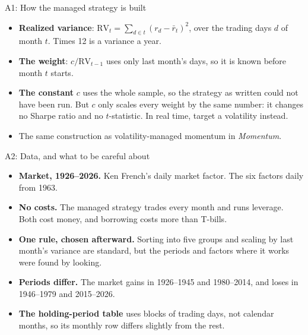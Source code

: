 \documentclass[aspectratio=169,10pt]{beamer}
\begin{document}
\begin{frame}[label=appendix_rv]{A1: How the managed strategy is built}
\begin{itemize}
\item \textbf{Realized variance}: $\text{RV}_{t} = \sum_{d \in t} (r_{d} - \bar r_{t})^{2}$, over the trading days $d$ of month $t$. Times 12 is a variance a year.
\vskip 8pt
\item \textbf{The weight}: $c/\text{RV}_{t-1}$ uses only last month's days, so it is known before month $t$ starts.
\vskip 8pt
\item \textbf{The constant} $c$ uses the whole sample, so the strategy as written could not have been run. But $c$ only scales every weight by the same number: it changes no Sharpe ratio and no $t$-statistic. In real time, target a volatility instead.
\vskip 8pt
\item The same construction as volatility-managed momentum in \emph{Momentum}.
\end{itemize}
\hfill \hyperlink{managed}{}
\end{frame}

\begin{frame}{A2: Data, and what to be careful about}
\begin{itemize}
\item \textbf{Market, 1926--2026.} Ken French's daily market factor. The six factors daily from 1963.
\vskip 8pt
\item \textbf{No costs.} The managed strategy trades every month and runs leverage. Both cost money, and borrowing costs more than T-bills.
\vskip 8pt
\item \textbf{One rule, chosen afterward.} Sorting into five groups and scaling by last month's variance are standard, but the periods and factors where it works were found by looking.
\vskip 8pt
\item \textbf{Periods differ.} The market gains in 1926--1945 and 1980--2014, and loses in 1946--1979 and 2015--2026.
\vskip 8pt
\item \textbf{The holding-period table} uses blocks of trading days, not calendar months, so its monthly row differs slightly from the rest.
\end{itemize}
\end{frame}
\end{document}
